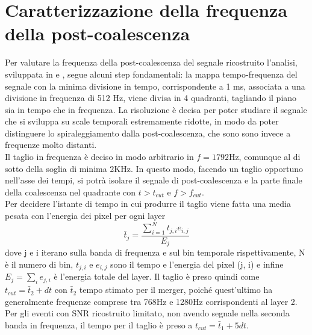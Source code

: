 \section{Caratterizzazione della frequenza della post-coalescenza}
\label{section:Frequenza_PM}
Per valutare la frequenza della post-coalescenza del segnale ricostruito l'analisi, sviluppata in \cite{Puecher_2018} e \cite{Tringali_2017}, segue alcuni step fondamentali:
la mappa tempo-frequenza del segnale con la minima divisione in tempo, corrispondente a 1 ms, associata a una divisione in frequenza di 512 Hz, viene divisa in 4 quadranti, tagliando il piano sia in tempo che in frequenza. La risoluzione è decisa per poter studiare il segnale che si sviluppa su scale temporali estremamente ridotte, in modo da poter distinguere lo spiraleggiamento dalla post-coalescenza, che sono sono invece a frequenze molto distanti.\\
Il taglio in frequenza è deciso in modo arbitrario in $f = 1792$Hz, comunque al di sotto della soglia di minima 2KHz. In questo modo, facendo un taglio opportuno nell'asse dei tempi, si potrà isolare il segnale di post-coalescenza e la parte finale della coalescenza nel quadrante con $t>t_{cut}$ e $f>f_{cut}$. \\ 
Per decidere l'istante di tempo in cui produrre il taglio viene fatta una media pesata con l'energia dei pixel per ogni layer
\begin{equation}
\bar{t}_j = \frac{\sum_{i=1}^Nt_{j,i}e_{i,j}}{E_{j}}
\end{equation}
dove j e i iterano sulla banda di frequenza e sul bin temporale rispettivamente, N è il numero di bin, $t_{j,i}$ e $e_{i,j}$ sono il tempo e l'energia del pixel (j, i) e infine $E_{j} = \sum_{i}e_{j,i}$ è l'energia totale del layer. Il taglio è preso quindi come $t_{cut} = \bar{t}_2 + dt$ con $\bar{t}_2$ tempo stimato per il merger, poiché quest'ultimo ha generalmente frequenze comprese tra 768Hz e 1280Hz corrispondenti al layer 2. Per gli eventi con SNR ricostruito limitato, non avendo segnale nella seconda banda in frequenza, il tempo per il taglio è preso a $t_{cut} = \bar{t}_1 + 5dt$. \\
